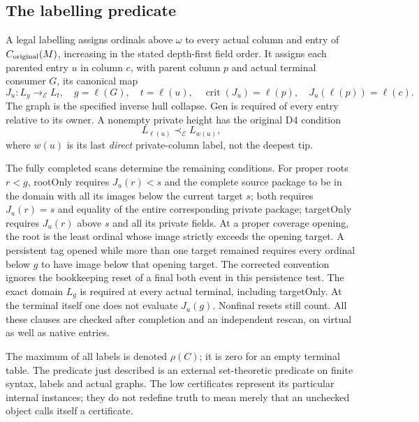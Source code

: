 \subsection{The labelling predicate}
A legal labelling assigns ordinals above $\omega$ to every actual
column and entry of $C_{\rm original}(M)$, increasing in the stated
depth-first field order. It assigns each parented entry $u$ in column
$c$, with parent column $p$ and actual terminal consumer $G$, its
canonical map
\[
 J_u:L_g\longrightarrow_{\mathcal E}L_t,
 \quad g=\ell(G),\quad t=\ell(u),\quad
 \operatorname{crit}(J_u)=\ell(p),\quad J_u(\ell(p))=\ell(c).
\]
The graph is the specified inverse hull collapse. Gen is required of
every entry relative to its owner. A nonempty private height has
the original D4 condition
\begin{equation}\label{eq:5-1}
                 L_{\ell(u)}\prec_{\mathcal E}L_{w(u)},       
\end{equation}
where $w(u)$ is its last \emph{direct} private-column label, not the
deepest tip.

The fully completed scans determine the remaining conditions. For
proper roots $r<g$, rootOnly requires $J_u(r)<s$ and the complete
source package to be in the domain with all its images below the
current target $s$; both requires $J_u(r)=s$ and equality of the
entire corresponding private package; targetOnly requires $J_u(r)$
above $s$ and all its private fields. At a proper coverage opening,
the root is the least ordinal whose image strictly exceeds the
opening target. A persistent tag opened while more than one target
remained requires every ordinal below $g$ to have image below that
opening target. The corrected convention ignores the bookkeeping
reset of a final both event in this persistence test. The exact
domain $L_g$ is required at every actual terminal, including
targetOnly. At the terminal itself one does not evaluate $J_u(g)$.
Nonfinal resets still count. All these clauses are checked after
completion and an independent rescan, on virtual as well as native entries.

The maximum of all labels is denoted $\rho(C)$; it is zero for an
empty terminal table. The predicate just described is an external
set-theoretic predicate on finite syntax, labels and actual graphs.
The low certificates represent its particular internal instances;
they do not redefine truth to mean merely that an unchecked object
calls itself a certificate.

